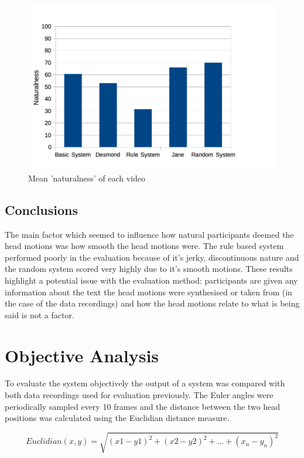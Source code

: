 \documentclass[bsc,frontabs,twoside,singlespacing,parskip]{infthesis}
\begin{document}
\begin{figure}
	\centering
	\includegraphics[width=1.0\textwidth]{chart.png}
	\caption{Mean 'naturalness' of each video}
\end{figure}

\subsection{Conclusions}

The main factor which seemed to influence how natural participants deemed the head motions was how smooth the head motions were. The rule based system performed poorly in the evaluation because of it's jerky, discontinuous nature and the random system scored very highly due to it's smooth motions. These results highlight a potential issue with the evaluation method: participants are given any information about the text the head motions were synthesised or taken from (in the case of the data recordings) and how the head motions relate to what is being said is not a factor. 

\section{Objective Analysis}

To evaluate the system objectively the output of a system was compared with both data recordings used for evaluation previously. The Euler angles were periodically sampled every 10 frames and the distance between the two head positions was calculated using the Euclidian distance measure.

$$ Euclidian(x,y) = \sqrt{(x1 - y1)^2 + (x2 - y2)^2 + ... + (x_n - y_n)^2}$$
\end{document}

